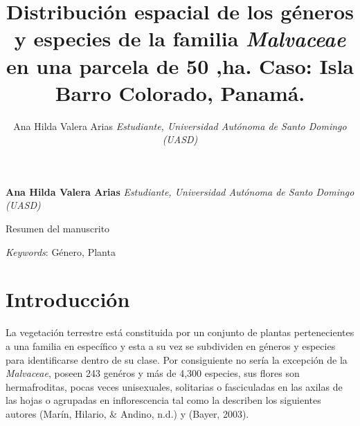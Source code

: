 \documentclass[11pt,]{article}
\title{Distribución espacial de los géneros y especies de la familia
\emph{Malvaceae} en una parcela de 50 ,ha. Caso: Isla Barro Colorado,
Panamá.  }
\author{\Large Ana Hilda Valera Arias\vspace{0.05in} \newline\normalsize\emph{Estudiante, Universidad Autónoma de Santo Domingo (UASD)}  }
\date{}
\newcommand*{\authorfont}{\fontfamily{phv}\selectfont}
\renewenvironment{abstract}
 {{%
    \setlength{\leftmargin}{0mm}
    \setlength{\rightmargin}{\leftmargin}%
  }%
  \relax}
 {\endlist}
\begin{document}
	
%

{%
\setlength{\parindent}{0pt}
\thispagestyle{plain}
{\fontsize{18}{20}\selectfont\raggedright 
\maketitle  %

}

{
   \vskip 13.5pt\relax \normalsize\fontsize{11}{12} 
\textbf{\authorfont Ana Hilda Valera Arias} \hskip 15pt \emph{\small Estudiante, Universidad Autónoma de Santo Domingo (UASD)}   

}

}








\begin{abstract}

    \hbox{\vrule height .2pt width 39.14pc}

    \vskip 8.5pt %

\noindent Resumen del manuscrito


\vskip 8.5pt \noindent \emph{Keywords}: Género, Planta \par

    \hbox{\vrule height .2pt width 39.14pc}



\end{abstract}


\vskip 6.5pt


\noindent  \section{Introducción}\label{introducciuxf3n}

La vegetación terrestre está constituida por un conjunto de plantas
pertenecientes a una familia en específico y esta a su vez se subdividen
en géneros y especies para identificarse dentro de su clase. Por
consiguiente no sería la excepción de la \emph{Malvaceae}, poseen 243
genéros y más de 4,300 especies, sus flores son hermafroditas, pocas
veces unisexuales, solitarias o fasciculadas en las axilas de las hojas
o agrupadas en inflorescencia tal como la describen los siguientes
autores (Marín, Hilario, \& Andino, n.d.) y (Bayer, 2003).
\end{document}
